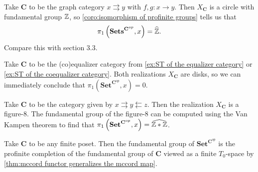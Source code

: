 \begin{example}
Take $\mathbf{C}$ to be the graph category $x \rightrightarrows y$ with $f,g : x \to y$. Then $X_{\mathbf{C}}$ is a circle with fundamental group $\mathbb{Z}$, so \cref{coro:isomorphism of profinite groups} tells us that
\[ \pi_1 \left( \mathbf{Sets}^{\mathbf{C}^{op}}, x\right) = \widehat{\mathbb{Z}}. \] Compare this with section 3.3.
\end{example}

\begin{example}
Take $\mathbf{C}$ to be the (co)equalizer category from \cref{ex:ST of the equalizer category} or \cref{ex:ST of the coequalizer category}. Both realizations $X_{\mathbf{C}}$ are disks, so we can immediately conclude that $\pi_1 \left( \mathbf{Set}^{\mathbf{C}^{op}}, x \right) = 0$.
\end{example}

\begin{example}
Take $\mathbf{C}$ to be the category given by $x \rightrightarrows y \leftleftarrows z$. Then the realization $X_{\mathbf{C}}$ is a figure-8. The fundamental group of the figure-8 can be computed using the Van Kampen theorem to find that $\pi_1\left(\mathbf{Set}^{\mathbf{C}^{op}}, x\right) = \widehat{\mathbb{Z} * \mathbb{Z}}$.
\end{example}

\begin{example}
Take $\mathbf{C}$ to be any finite poset. Then the fundamental group of $\mathbf{Set}^{\mathbf{C}^{op}}$ is the profinite completion of the fundamental group of $\mathbf{C}$ viewed as a finite $T_0$-space by \cref{thm:mccord functor generalizes the mccord map}.
\end{example}
